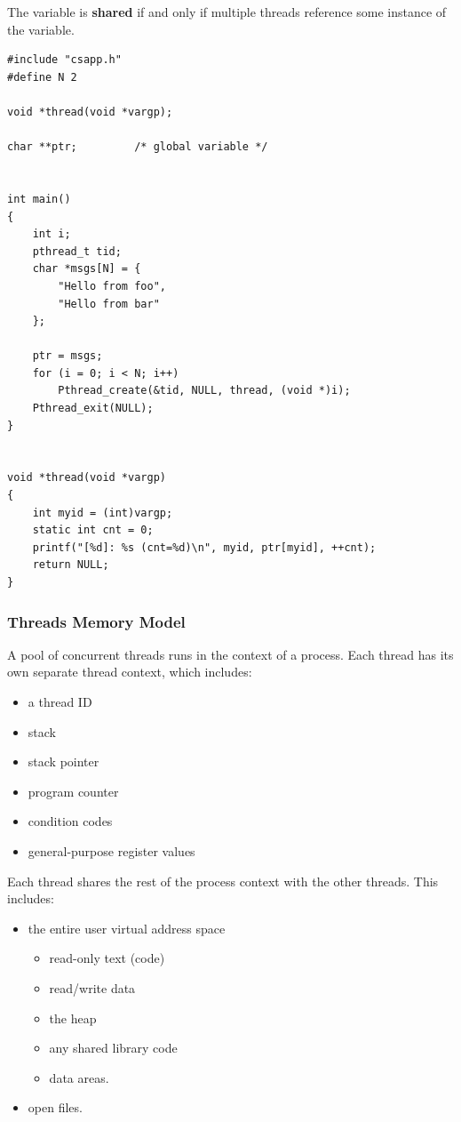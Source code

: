 \documentclass[11pt]{article}
\begin{document}
The variable is \textbf{shared} if and only if multiple threads reference some instance of the variable.\\


\begin{verbatim}
#include "csapp.h"
#define N 2

void *thread(void *vargp);

char **ptr;			/* global variable */


int main()
{
    int i;
    pthread_t tid;
    char *msgs[N] = {
        "Hello from foo",
        "Hello from bar"
    };

    ptr = msgs;
    for (i = 0; i < N; i++)
        Pthread_create(&tid, NULL, thread, (void *)i);
    Pthread_exit(NULL);
}


void *thread(void *vargp)
{
    int myid = (int)vargp;
    static int cnt = 0;
    printf("[%d]: %s (cnt=%d)\n", myid, ptr[myid], ++cnt);
    return NULL;
}

\end{verbatim}

\subsubsection{Threads Memory Model}
\label{sec:orgf431ff1}
A pool of concurrent threads runs in the context of a process. Each thread has its own separate thread context, which includes:\\
\begin{itemize}
\item a thread ID\\
\item stack\\
\item stack pointer\\
\item program counter\\
\item condition codes\\
\item general-purpose register values\\
\end{itemize}

Each thread shares the rest of the process context with the other threads. This includes:\\
\begin{itemize}
\item the entire user virtual address space\\
\begin{itemize}
\item read-only text (code)\\
\item read/write data\\
\item the heap\\
\item any shared library code\\
\item data areas.\\
\end{itemize}
\item open files.\\
\end{itemize}
\end{document}
